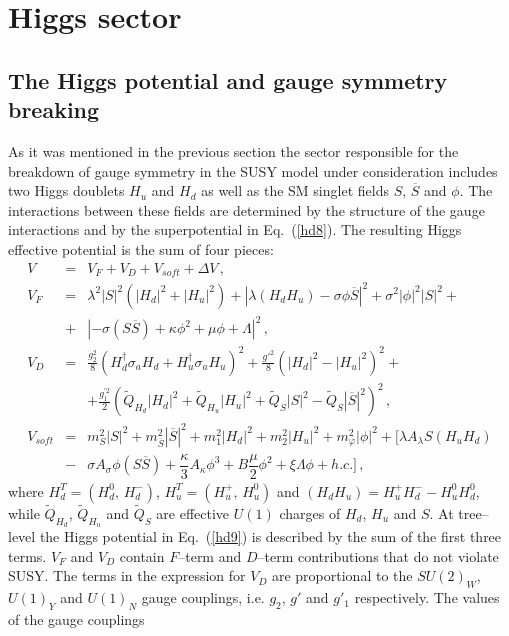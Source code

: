 \documentclass[12pt,a4paper]{article}
\newcommand{\be}{\begin{equation}}
\newcommand{\ee}{\end{equation}}
\newcommand{\ba}{\begin{array}}
\newcommand{\ea}{\end{array}}
\newcommand{\ds}{\displaystyle}
\begin{document}
\section{Higgs sector}
\subsection{The Higgs potential and gauge symmetry breaking}

As it was mentioned in the previous section the sector responsible for the breakdown of gauge symmetry in the SUSY
model under consideration includes two Higgs doublets $H_u$ and $H_d$ as well as the SM singlet fields $S$,
$\overline{S}$ and $\phi$. The interactions between these fields are determined by the structure of the gauge
interactions and by the superpotential in Eq.~(\ref{hd8}). The resulting Higgs effective potential is the sum
of four pieces:
\be
\ba{rcl}
V&=&V_F+V_D+V_{soft}+\Delta V\, ,\\[2mm]
V_F&=&\lambda^2|S|^2(|H_d|^2+|H_u|^2) + \left|\lambda (H_d H_u) - \sigma \phi \overline{S}\right|^2
+ \sigma^2 |\phi|^2 |S|^2 + \\[2mm]
& + &\left| - \sigma (S \overline{S}) + \kappa \phi^2 + \mu \phi + \Lambda \right|^2\,,\\[2mm]
V_D&=&\ds\frac{g_2^2}{8}\left(H_d^\dagger \sigma_a H_d+H_u^\dagger \sigma_a H_u\right)^2
+\frac{{g'}^2}{8}\left(|H_d|^2-|H_u|^2\right)^2+\\[2mm]
&&+\ds\frac{g^{'2}_1}{2}\left(\tilde{Q}_{H_d} |H_d|^2+\tilde{Q}_{H_u} |H_u|^2+\tilde{Q}_S |S|^2 - \tilde{Q}_S |\overline{S}|^2 \right)^2\,,\\[2mm]
V_{soft}&=&m_{S}^2 |S|^2 + m_{\overline{S}}^2 |\overline{S}|^2 + m_1^2|H_d|^2 + m_2^2|H_u|^2 +
m^2_{\varphi}|\phi|^2+ \biggl[\lambda A_{\lambda} S (H_u H_d) \\[2mm]
&-& \sigma A_{\sigma} \phi (S \overline{S}) + \dfrac{\kappa}{3} A_{\kappa} \phi^3 + B\dfrac{\mu}{2} \phi^2 + \xi \Lambda \phi + h.c.\biggr]\,,
\ea
\label{hd9}
\ee
where $H_d^T=(H_d^0,\,H_d^{-})$, $H_u^T=(H_u^{+},\,H_u^{0})$ and $(H_d H_u)=H_u^{+}H_d^{-}-H_u^{0}H_d^{0}$,
while $\tilde{Q}_{H_d}$, $\tilde{Q}_{H_u}$ and $\tilde{Q}_S$ are effective $U(1)$ charges of $H_d$, $H_u$ and $S$.
At tree--level the Higgs potential in Eq.~(\ref{hd9}) is described by the sum of the first three terms. $V_F$ and $V_D$ contain
$F$--term and $D$--term contributions that do not violate SUSY. The terms in the expression for $V_D$ are proportional to
the $SU(2)_W$, $U(1)_Y$ and $U(1)_{N}$ gauge couplings, i.e. $g_2,\,g'$ and $g'_1$ respectively. The values of the gauge couplings
\end{document}
